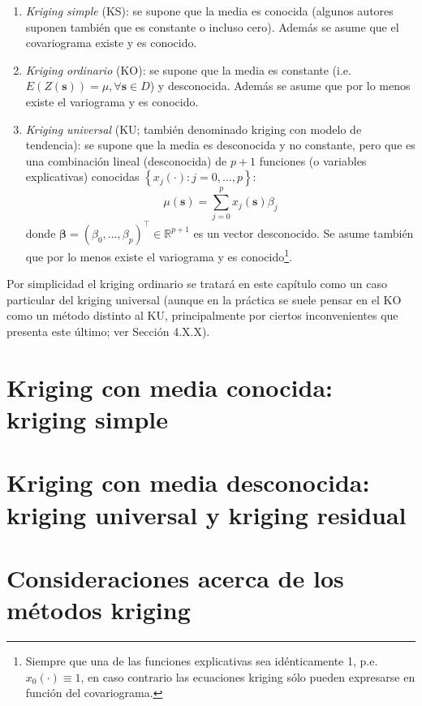 \documentclass[
  spanish,
]{book}
\theoremstyle{break}
\theoremstyle{definition}
\theoremstyle{definition}
\theoremstyle{definition}
\theoremstyle{definition}
\theoremstyle{remark}
\begin{document}
\begin{enumerate}
\def\labelenumi{\arabic{enumi}.}
\item
  \emph{Kriging simple} (KS): se supone que la media es conocida (algunos autores suponen también que es constante o incluso cero).
  Además se asume que el covariograma existe y es conocido.
\item
  \emph{Kriging ordinario} (KO): se supone que la media es constante (i.e.~\(E(Z(\mathbf{s}))=\mu ,\forall \mathbf{s}\in D\)) y desconocida.
  Además se asume que por lo menos existe el variograma y es conocido.
\item
  \emph{Kriging universal} (KU; también denominado kriging con modelo de tendencia): se supone que la media es desconocida y no constante, pero
  que es una combinación lineal (desconocida) de \(p+1\) funciones (o variables explicativas) conocidas \(\left\{ x_j(\cdot) : j = 0, \ldots, p \right\}\):
  \[\mu(\mathbf{s})=\sum\limits_{j=0}^{p}x_j (\mathbf{s})\beta_j\]
  donde \(\boldsymbol{\beta} = (\beta_{0}, \ldots, \beta_{p} )^\top \in \mathbb{R}^{p+1}\) es un vector desconocido.
  Se asume también que por lo menos existe el variograma y es conocido\footnote{Siempre que una de las funciones explicativas sea idénticamente 1, p.e. \(x_{0}(\cdot) \equiv 1\), en caso contrario las ecuaciones kriging sólo pueden expresarse en función del covariograma.}.
\end{enumerate}

Por simplicidad el kriging ordinario se tratará en este capítulo como un caso particular del kriging universal (aunque en la práctica se suele
pensar en el KO como un método distinto al KU, principalmente por ciertos inconvenientes que presenta este último; ver Sección 4.X.X).

\hypertarget{ksimple}{%
\section{Kriging con media conocida: kriging simple}\label{ksimple}}

\hypertarget{kuniversal}{%
\section{Kriging con media desconocida: kriging universal y kriging residual}\label{kuniversal}}

\hypertarget{consideraciones-kriging}{%
\section{Consideraciones acerca de los métodos kriging}\label{consideraciones-kriging}}
\end{document}

